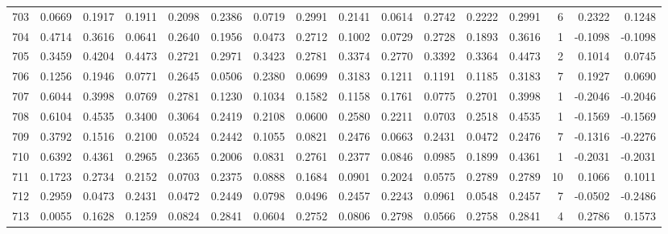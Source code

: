 \begin{tabular}{lrrrrrrrrrrrrrrr}
703 &      0.0669 &  0.1917 &  0.1911 &  0.2098 &  0.2386 &  0.0719 &  0.2991 &  0.2141 &  0.0614 &  0.2742 &   0.2222 &     0.2991 &      6 &                    0.2322 &                     0.1248 \\
704 &      0.4714 &  0.3616 &  0.0641 &  0.2640 &  0.1956 &  0.0473 &  0.2712 &  0.1002 &  0.0729 &  0.2728 &   0.1893 &     0.3616 &      1 &                   -0.1098 &                    -0.1098 \\
705 &      0.3459 &  0.4204 &  0.4473 &  0.2721 &  0.2971 &  0.3423 &  0.2781 &  0.3374 &  0.2770 &  0.3392 &   0.3364 &     0.4473 &      2 &                    0.1014 &                     0.0745 \\
706 &      0.1256 &  0.1946 &  0.0771 &  0.2645 &  0.0506 &  0.2380 &  0.0699 &  0.3183 &  0.1211 &  0.1191 &   0.1185 &     0.3183 &      7 &                    0.1927 &                     0.0690 \\
707 &      0.6044 &  0.3998 &  0.0769 &  0.2781 &  0.1230 &  0.1034 &  0.1582 &  0.1158 &  0.1761 &  0.0775 &   0.2701 &     0.3998 &      1 &                   -0.2046 &                    -0.2046 \\
708 &      0.6104 &  0.4535 &  0.3400 &  0.3064 &  0.2419 &  0.2108 &  0.0600 &  0.2580 &  0.2211 &  0.0703 &   0.2518 &     0.4535 &      1 &                   -0.1569 &                    -0.1569 \\
709 &      0.3792 &  0.1516 &  0.2100 &  0.0524 &  0.2442 &  0.1055 &  0.0821 &  0.2476 &  0.0663 &  0.2431 &   0.0472 &     0.2476 &      7 &                   -0.1316 &                    -0.2276 \\
710 &      0.6392 &  0.4361 &  0.2965 &  0.2365 &  0.2006 &  0.0831 &  0.2761 &  0.2377 &  0.0846 &  0.0985 &   0.1899 &     0.4361 &      1 &                   -0.2031 &                    -0.2031 \\
711 &      0.1723 &  0.2734 &  0.2152 &  0.0703 &  0.2375 &  0.0888 &  0.1684 &  0.0901 &  0.2024 &  0.0575 &   0.2789 &     0.2789 &     10 &                    0.1066 &                     0.1011 \\
712 &      0.2959 &  0.0473 &  0.2431 &  0.0472 &  0.2449 &  0.0798 &  0.0496 &  0.2457 &  0.2243 &  0.0961 &   0.0548 &     0.2457 &      7 &                   -0.0502 &                    -0.2486 \\
713 &      0.0055 &  0.1628 &  0.1259 &  0.0824 &  0.2841 &  0.0604 &  0.2752 &  0.0806 &  0.2798 &  0.0566 &   0.2758 &     0.2841 &      4 &                    0.2786 &                     0.1573 \\

\end{tabular}
